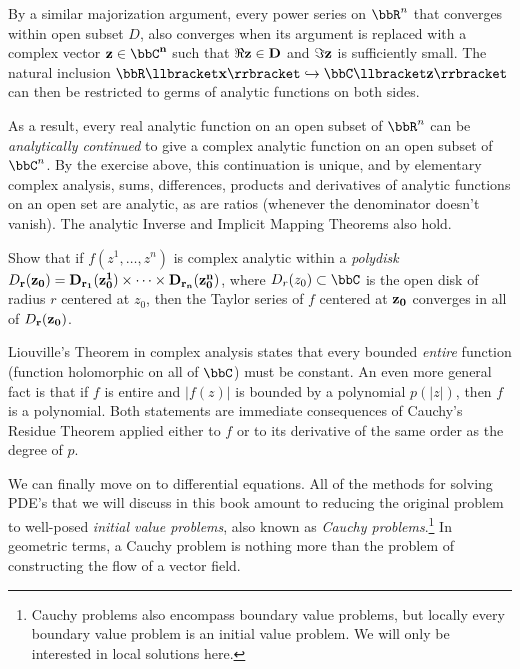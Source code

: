 By a similar majorization argument, every power series on $\bbR^n$ that converges within open subset $D$, also converges when its argument is replaced with a complex vector $\bf{z}\in\bbC^n$ such that $\Re \bf{z}\in D$ and $\Im\bf{z}$ is sufficiently small. The natural inclusion $\bbR\llbracket\bf{x}\rrbracket\hookrightarrow \bbC\llbracket\bf{z}\rrbracket$ can then be restricted to germs of analytic functions on both sides. 

As a result, every real analytic function on an open subset of $\bbR^n$ can be \emph{analytically continued} to give a complex analytic function on an open subset of $\bbC^n$. By the exercise above, this continuation is unique, and by elementary complex analysis, sums, differences, products and derivatives of analytic functions on an open set are analytic, as are ratios (whenever the denominator doesn't vanish). The analytic Inverse and Implicit Mapping Theorems also hold. 

\begin{xca}
    Show that if $f(z^1,\ldots,z^n)$ is complex analytic within a \emph{polydisk} $D_{\bf{r}}(\bf{z}_0)=D_{r_1}(z_0^1)\times\cdots \times D_{r_n}(z_0^n)$, where $D_r(z_0) \subset \bbC$ is the open disk of radius $r$ centered at $z_0$, then the Taylor series of $f$ centered at $\bf{z}_0$ converges in all of $D_{\bf{r}}(\bf{z}_0)$.
\end{xca}

\begin{example}
    Liouville's Theorem in complex analysis states that every bounded \emph{entire} function (function holomorphic on all of $\bbC$) must be constant. An even more general fact is that if $f$ is entire and $|f(z)|$ is bounded by a polynomial $p(|z|)$, then $f$ is a polynomial. Both statements are immediate consequences of Cauchy's Residue Theorem applied either to $f$ or to its derivative of the same order as the degree of $p$.
\end{example}


We can finally move on to differential equations. All of the methods for solving PDE's that we will discuss in this book amount to reducing the original problem to well-posed \emph{initial value problems}, also known as \emph{Cauchy problems}.\footnote{Cauchy problems also encompass boundary value problems, but locally every boundary value problem is an initial value problem. We will only be interested in local solutions here.} In geometric terms, a Cauchy problem is nothing more than the problem of constructing the flow of a vector field. 


